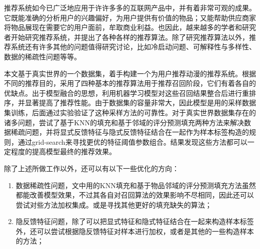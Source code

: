 
\begin{summary}
推荐系统如今已广泛地应用于许许多多的互联网产品中，并有着非常可观的成果。它既能准确的分析用户的兴趣偏好，为用户提供有价值的物品；又能帮助供应商家将物品展现在需要它的用户面前，牟取商业利益。也因此，越来越多的学者和研究者开始研究推荐系统，并提出了各种各样的推荐算法。除了研究推荐算法以外，推荐系统还有许多其他的问题值得研究讨论，比如冷启动问题、可解释性与多样性、数据的稀疏性问题等等。

本文基于真实世界的一个数据集，着手构建一个为用户推荐动漫的推荐系统。根据不同的推荐目的，采用了四种基本的推荐算法用于推荐召回阶段，它们有着各自的优缺点。出于模型融合的思想，利用机器学习模型对这些召回结果整合后进行重排序，并显著提高了推荐性能。由于数据集的容量非常大，因此模型是用的采样数据集训练，后面通过实验验证了这种采样方法的可靠性。对于真实世界数据集存在的诸多问题，尝试了基于KNN的填充和基于邻域的评分预测填充两种方法来解决数据稀疏问题，并将显式反馈特征与隐式反馈特征结合在一起作为样本标签构造的规则，通过grid-search来寻找更优的特征阈值参数组合。结果发现这些方法都可以一定程度的提高模型最终的推荐效果。

除了上述所做工作以外，还可以有以下一些优化的方向：
\begin{enumerate}
	\item 数据稀疏性问题，文中用的KNN填充和基于物品邻域的评分预测填充方法虽然都能改善模型效果，不过其各自对召回算法的效果影响不尽相同，因此还可以尝试对些方法加权集成。或是寻找其他更好的填充缺失的算法；
	\item 隐反馈特征问题，除了可以把显式特征和隐式特征结合在一起来构造样本标签外，还可以尝试根据隐反馈特征对样本进行加权，或者是其他的一些构造样本的方法；
\end{enumerate}
\end{summary}

